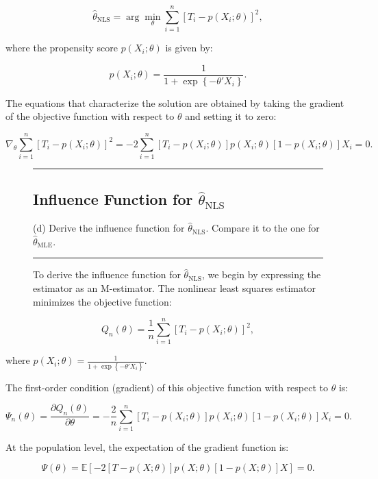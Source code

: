 \documentclass{article}
\newenvironment{colorparagraph}[1]{\par\color{#1}}{\par}
\begin{document}
\[
\hat{\theta}_{\text{NLS}} = \arg\min_{\theta} \sum_{i=1}^n \left[ T_i - p(X_i; \theta) \right]^2,
\]

where the propensity score \( p(X_i; \theta) \) is given by:

\[
p(X_i; \theta) = \frac{1}{1 + \exp\left\{ - \theta' X_i \right\}}.
\]

The equations that characterize the solution are obtained by taking the gradient of the objective function with respect to \( \theta \) and setting it to zero:

\[
\nabla_{\theta} \sum_{i=1}^n \left[ T_i - p(X_i; \theta) \right]^2 = -2 \sum_{i=1}^n \left[ T_i - p(X_i; \theta) \right] p(X_i; \theta) [1 - p(X_i; \theta)] X_i = 0.
\]

\begin{figure}[H]
\begin{colorparagraph}{questioncolor}
\label{q1d}
\rule{\textwidth}{0.5pt}
\subsection{Influence Function for \( \hat{\theta}_{\text{NLS}} \)}
(d) Derive the influence function for \( \hat{\theta}_{\text{NLS}} \).
Compare it to the one for \( \hat{\theta}_{\text{MLE}} \).

\rule{\textwidth}{0.5pt}
\end{colorparagraph}

To derive the influence function for \( \hat{\theta}_{\text{NLS}} \), we begin by expressing the estimator as an M-estimator. The nonlinear least squares estimator minimizes the objective function:
\end{figure}

\[
Q_n(\theta) = \frac{1}{n} \sum_{i=1}^n \left[ T_i - p(X_i; \theta) \right]^2,
\]

where \( p(X_i; \theta) = \frac{1}{1 + \exp\left\{ - \theta' X_i \right\}} \).

The first-order condition (gradient) of this objective function with respect to \( \theta \) is:

\[
\Psi_n(\theta) = \frac{\partial Q_n(\theta)}{\partial \theta} = -\frac{2}{n} \sum_{i=1}^n \left[ T_i - p(X_i; \theta) \right] p(X_i; \theta) [1 - p(X_i; \theta)] X_i = 0.
\]

At the population level, the expectation of the gradient function is:

\[
\Psi(\theta) = \mathbb{E} \left[ -2 \left[ T - p(X; \theta) \right] p(X; \theta) [1 - p(X; \theta)] X \right] = 0.
\]
\end{document}
